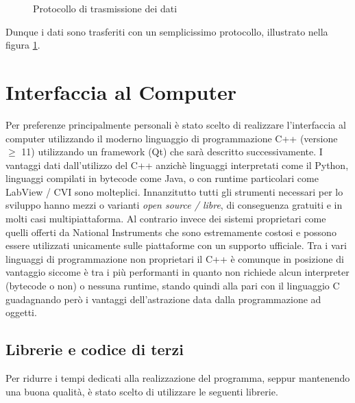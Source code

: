 \begin{figure}[H] \centering
    \caption{Protocollo di trasmissione dei dati \label{fig:proto}}
\end{figure}
Dunque i dati sono trasferiti con un semplicissimo protocollo, illustrato
nella figura \ref{fig:proto}.

\section{Interfaccia al Computer}
Per preferenze principalmente personali \`e stato scelto di realizzare
l'interfaccia al computer utilizzando il moderno linguaggio di programmazione
C++ (versione \(\geq\) 11) utilizzando un framework (Qt) che sar\`a descritto
successivamente.  I vantaggi dati dall'utilizzo del C++ anzich\`e linguaggi
interpretati come il Python, linguaggi compilati in bytecode come Java, o con
runtime particolari come LabView / CVI sono molteplici. Innanzitutto tutti gli
strumenti necessari per lo sviluppo hanno mezzi o varianti \emph{open source /
libre}, di conseguenza gratuiti e in molti casi multipiattaforma. Al contrario
invece dei sistemi proprietari come quelli offerti da National Instruments che
sono estremamente costosi e possono essere utilizzati unicamente sulle
piattaforme con un supporto ufficiale.  Tra i vari linguaggi di programmazione
non proprietari il C++ \`e comunque in posizione di vantaggio siccome \`e tra
i pi\`u performanti in quanto non richiede alcun interpreter (bytecode o non)
o nessuna runtime, stando quindi alla pari con il linguaggio C guadagnando
per\`o i vantaggi dell'astrazione data dalla programmazione ad oggetti.

\subsection{Librerie e codice di terzi}
Per ridurre i tempi dedicati alla realizzazione del programma, seppur
mantenendo una buona qualit\`a, \`e stato scelto di utilizzare le seguenti
librerie.

